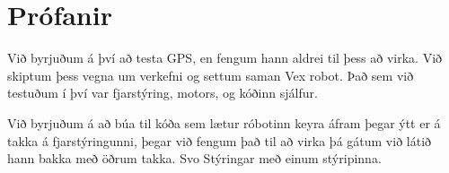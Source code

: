 \section{Prófanir}
Við byrjuðum á því að testa GPS, en fengum hann aldrei til þess að virka. Við skiptum þess vegna um verkefni og settum saman Vex robot. Það sem við testuðum í því var fjarstýring, motors, og kóðinn sjálfur.

Við byrjuðum á að búa til kóða sem lætur róbotinn keyra áfram þegar ýtt er á takka á fjarstýringunni, þegar við fengum það til að virka þá gátum við látið hann bakka með öðrum takka. Svo Stýringar með einum stýripinna.
